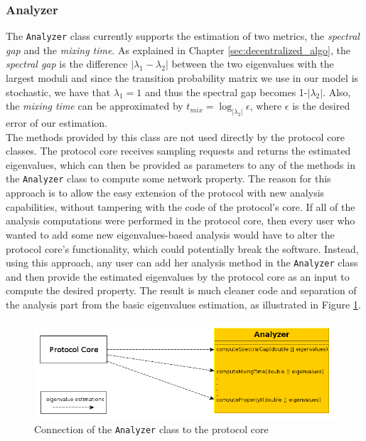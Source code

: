 \documentclass[a4paper,11pt,twoside]{report}
\newcommand{\classname}[1]{\texttt{#1}}
\begin{document}
\subsubsection*{Analyzer}
 
The \classname{Analyzer} class currently supports the estimation of two metrics, the \textit{spectral gap} and the \textit{mixing time}. As explained in Chapter \ref{sec:decentralized_algo}, the \textit{spectral gap} is the difference  $|\lambda_1 - \lambda_2|$ between the two eigenvalues with the largest moduli and since the transition probability matrix we use in our model is stochastic, we have that $\lambda_1=1$ and thus the spectral gap becomes 1-$|\lambda_2|$. Also, the \textit{mixing time} can be approximated by $t_{mix} = \log _{|\lambda_2|}\epsilon$, where $\epsilon$ is the desired error of our estimation.\\

The methods provided by this class are not used directly by the protocol core classes. The protocol core receives sampling requests and returns the estimated eigenvalues, which can then be provided as parameters to any of the methods in the \classname{Analyzer} class to compute some network property. The reason for this approach is to allow the easy extension of the protocol with new analysis capabilities, without tampering with the code of the protocol's core. If all of the analysis computations were performed in the protocol core, then every user who wanted to add some new eigenvalues-based analysis would have to alter the protocol core's functionality, which could potentially break the software. Instead, using this approach, any user can add her analysis method in the \classname{Analyzer} class and then provide the estimated eigenvalues by the protocol core as an input to compute the desired property. The result is much cleaner code and separation of the analysis part from the basic eigenvalues estimation, as illustrated in Figure \ref{fig:analyzer_estimations}.


\begin{figure} [H]
   \centering
    \includegraphics[scale=0.6]{../figures/analyzer.png}
     \caption{Connection of the \classname{Analyzer} class to the protocol core}
     \label{fig:analyzer_estimations}
\end{figure}
\end{document}
